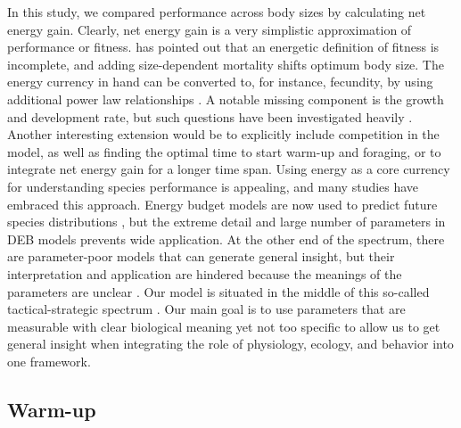 In this study, we compared performance across body sizes by calculating net energy gain.
Clearly, net energy gain is a very simplistic approximation of performance or fitness.
\citet{Kozlowski1996} has pointed out that an energetic definition of fitness is incomplete, and adding size-dependent mortality shifts optimum body size.
The energy currency in hand can be converted to, for instance, fecundity, by using additional power law relationships \citep{Kooijman2009}. %
A notable missing component is the growth and development rate, but such questions have been investigated heavily \citep{VandH1996, Kozlowski2004,Kooijman2009}.
Another interesting extension would be to explicitly include competition in the model, as well as finding the optimal time to start warm-up and foraging, or to integrate net energy gain for a longer time span.
Using energy as a core currency for understanding species performance is appealing, and many studies have embraced this approach.
Energy budget models are now used to predict future species distributions \citep[e.g.,][]{Buckley2008}, but the extreme detail and large number of parameters in DEB models \citep{Kooijman2009} prevents wide application.
At the other end of the spectrum, there are parameter-poor models that can generate general insight, but their interpretation and application are hindered because the meanings of the parameters are unclear \citep[e.g.,][]{Brown1993}.
Our model is situated in the middle of this so-called tactical-strategic spectrum \citet{Holling1966}.
Our main goal is to use parameters that are measurable with clear biological meaning yet not too specific to allow us to get general insight when integrating the role of physiology, ecology, and behavior into one framework.

\subsection*{Warm-up}

